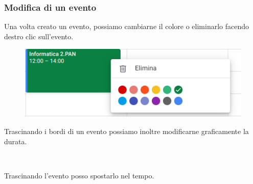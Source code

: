 \documentclass[]{beamer}
\begin{document}
\begin{frame}
\frametitle{Modifica di un evento}
Una volta creato un evento, possiamo cambiarne il colore o eliminarlo facendo destro clic sull'evento.

\begin{figure}
  \includegraphics[width=.6\columnwidth]{img/calendarcolore.png}
\end{figure}

Trascinando i bordi di un evento possiamo inoltre modificarne graficamente la durata.

~

Trascinando l'evento posso spostarlo nel tempo.
\end{frame}
\end{document}
